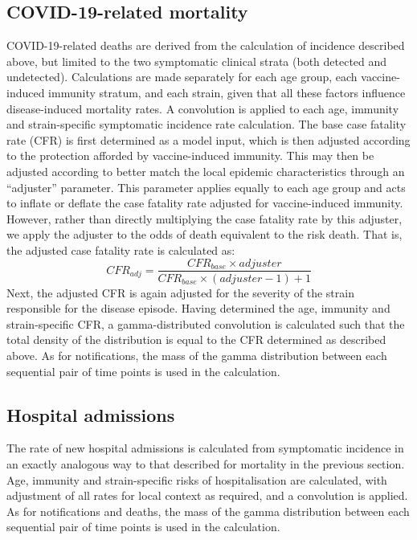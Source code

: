 \subsection{COVID-19-related mortality}
COVID-19-related deaths are derived from the calculation of incidence described above,
but limited to the two symptomatic clinical strata (both detected and undetected).
Calculations are made separately for each age group, each vaccine-induced immunity stratum,
and each strain, given that all these factors influence disease-induced mortality rates.
A convolution is applied to each age, immunity and strain-specific symptomatic incidence rate calculation.
The base case fatality rate (CFR) is first determined as a model input,  %
which is then adjusted according to the protection afforded by vaccine-induced immunity.
This may then be adjusted according to better match the local epidemic characteristics through an
``adjuster'' parameter.
This parameter applies equally to each age group and acts to inflate or deflate the case fatality rate
adjusted for vaccine-induced immunity.
However, rather than directly multiplying the case fatality rate by this adjuster,
we apply the adjuster to the odds of death equivalent to the risk death.
That is, the adjusted case fatality rate is calculated as:
\[CFR_{adj} = \frac{CFR_{base} \times adjuster}{CFR_{base} \times (adjuster - 1) + 1}\]
Next, the adjusted CFR is again adjusted for the severity of the strain
responsible for the disease episode.
Having determined the age, immunity and strain-specific CFR,
a gamma-distributed convolution is calculated such that the total density
of the distribution is equal to the CFR determined as described above.  %
As for notifications, the mass of the gamma distribution between each sequential pair of time points is
used in the calculation.

\subsection{Hospital admissions}
The rate of new hospital admissions is calculated from symptomatic incidence in an exactly analogous way
to that described for mortality in the previous section.
Age, immunity and strain-specific risks of hospitalisation are calculated,
with adjustment of all rates for local context as required, and a convolution is applied.
As for notifications and deaths, the mass of the gamma distribution between each sequential pair of time points is
used in the calculation.

